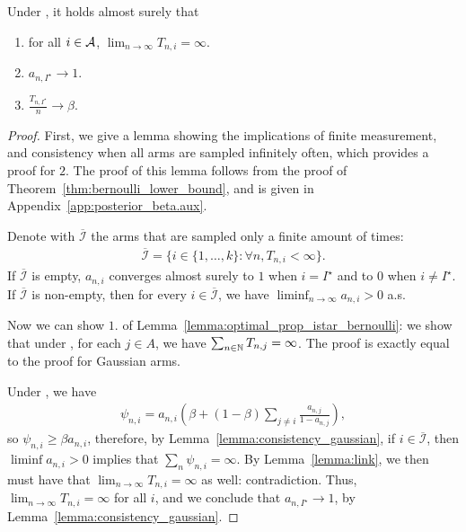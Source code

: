 \begin{lemma}\label{lemma:optimal_prop_istar_bernoulli}
\begin{leftbar}[lemmabar]
	Under \TTTS, it holds almost surely that
	\begin{enumerate}
		\item for all $i \in \mathcal{A}$, $\lim_{n\rightarrow \infty} T_{n,i} = \infty.$
		\item $a_{n,I^\star} \rightarrow 1.$
		\item $\frac{T_{n,I^\star}}{n} \rightarrow \beta$.
	\end{enumerate}
\end{leftbar}
\end{lemma}

\begin{proof}
First, we give a lemma showing the implications of finite measurement, and consistency when all arms are sampled infinitely often, which provides a proof for $2.$ The proof of this lemma follows from the proof of Theorem~\ref{thm:bernoulli_lower_bound}, and is given in Appendix~\ref{app:posterior_beta.aux}. 

\begin{lemma}\label{lemma:consistency_bernoulli}
\begin{leftbar}
	Denote with $\overline{\mathcal{I}}$ the arms that are sampled only a finite amount of times:
	\begin{align*}
	\overline{\mathcal{I}} = \{ i \in \{ 1, \ldots, k \} : \forall n, T_{n,i} < \infty \}.
	\end{align*}
	If $\overline{\mathcal{I}}$ is empty, $a_{n,i}$ converges almost surely to $1$ when $i = I^\star$ and to $0$ when $i \neq I^\star$. If $\overline{\mathcal{I}}$ is non-empty, then for every $i \in \overline{\mathcal{I}}$, we have $\liminf_{n \rightarrow \infty} a_{n,i} > 0$ a.s.
\end{leftbar}
\end{lemma}

Now we can show $1.$ of Lemma~\ref{lemma:optimal_prop_istar_bernoulli}: we show that under \TTTS, for each $j \in A$, we have $\sum_{n \in {\mathbb N}} T_{n,j} = \infty$. The proof is exactly equal to the proof for Gaussian arms. 

Under \TTTS, we have
\begin{align*}
\psi_{n,i} = a_{n,i} \left( \beta + (1-\beta) \sum_{j \neq i} \frac{a_{n,j}}{1- a_{n,j}} \right),
\end{align*}
so $ \psi_{n,i}  \geq \beta a_{n,i}$, therefore, by Lemma~\ref{lemma:consistency_gaussian}, if $i \in \overline{\mathcal{I}}$, then $\liminf a_{n,i} > 0$ implies that $\sum_n \psi_{n,i} = \infty$. By Lemma~\ref{lemma:link}, we then must have that $\lim_{n \rightarrow \infty} T_{n,i} = \infty$ as well: contradiction.  Thus, $\lim_{n \rightarrow \infty} T_{n,i} = \infty$ for all $i$, and we conclude that $a_{n,I^\star} \rightarrow 1$, by Lemma~\ref{lemma:consistency_gaussian}. 


\end{proof}
